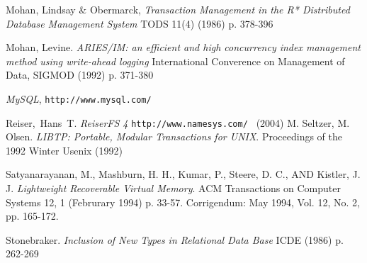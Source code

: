 \documentclass[letterpaper,twocolumn,english]{article}
\begin{document}
\begin{thebibliography}{99}
 Mohan, Lindsay \& Obermarck, {\em Transaction Management in the R* Distributed Database Management System} TODS 11(4) (1986) p. 378-396

 Mohan, Levine. {\em ARIES/IM: an efficient and high concurrency index management method using write-ahead logging} International Converence on Management of Data, SIGMOD (1992) p. 371-380

 {\em MySQL}, {\tt http://www.mysql.com/ }

 Reiser,~Hans~T. {\em ReiserFS 4} {\tt http://www.namesys.com/ } (2004)
%
 M. Seltzer, M. Olsen. {\em LIBTP: Portable, Modular Transactions for UNIX}. Proceedings of the 1992 Winter Usenix (1992)

 Satyanarayanan, M., Mashburn, H. H., Kumar, P., Steere, D. C., AND Kistler, J. J. {\em Lightweight Recoverable Virtual Memory}. ACM Transactions on Computer Systems 12, 1 (Februrary 1994) p. 33-57. Corrigendum: May 1994, Vol. 12, No. 2, pp. 165-172.

 Stonebraker. {\em Inclusion of New Types in Relational Data Base } ICDE (1986) p. 262-269

%
%


%
%
%
%
%
%
%

\end{thebibliography}
\end{document}

